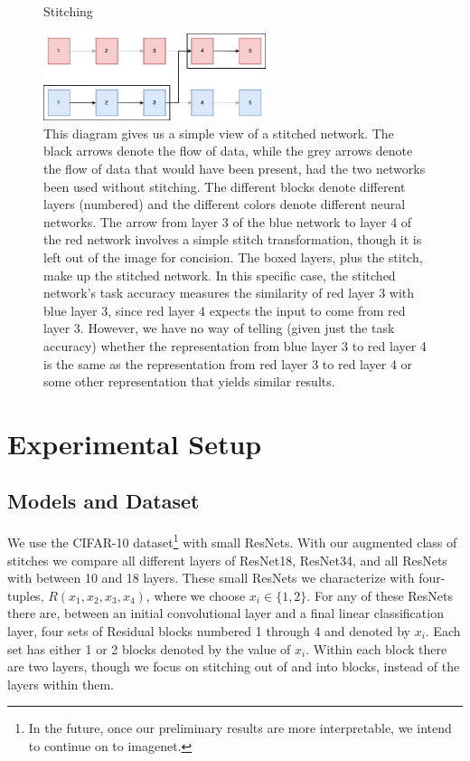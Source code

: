 \documentclass{article} %
\begin{document}
\begin{center}
   \begin{figure}[h!]
      \centering
      \caption{Stitching}
      \includegraphics[width=6.5cm]{stitch.jpg}
      \caption*{This diagram gives us a simple view of a stitched network. The black arrows denote the flow of data, while
      the grey arrows denote the flow of data that would have been present, had the two networks been used without stitching.
      The different blocks denote different layers (numbered) and the different colors denote different neural networks. The arrow
      from layer 3 of the blue network to layer 4 of the red network involves a simple stitch transformation, though it is left
      out of the image for concision. The boxed layers, plus the stitch, make up the stitched network. In this specific case,
      the stitched network's task accuracy measures the similarity of red layer 3 with blue layer 3, since red layer 4 expects the
      input to come from red layer 3. However, we have no way of telling (given just the task accuracy) whether the representation
      from blue layer 3 to red layer 4 is the same as the representation from red layer 3 to red layer 4 or some other representation
      that yields similar results.}
   \end{figure}
\end{center}

\section{Experimental Setup}
\label{ExperimentalSetup}
\subsection*{Models and Dataset}
We use the CIFAR-10 dataset\footnote{In the future, once our preliminary results are more interpretable, we intend to
continue on to imagenet.} with small ResNets. With our augmented class of stitches we compare all different
layers of ResNet18, ResNet34, and all
ResNets with between 10 and 18 layers. These small ResNets we characterize with four-tuples,
$R(x_1, x_2, x_3, x_4)$, where we choose $x_i \in \{1, 2\}$. For any of these ResNets there are, between an initial convolutional
layer and a final linear classification layer, four sets of Residual blocks numbered 1 through 4 and denoted by
$x_i$. Each set has either 1 or 2 blocks denoted by the value of $x_i$. Within each block there are two layers,
though we focus on stitching out of and into blocks, instead of the layers within them. 
\end{document}
